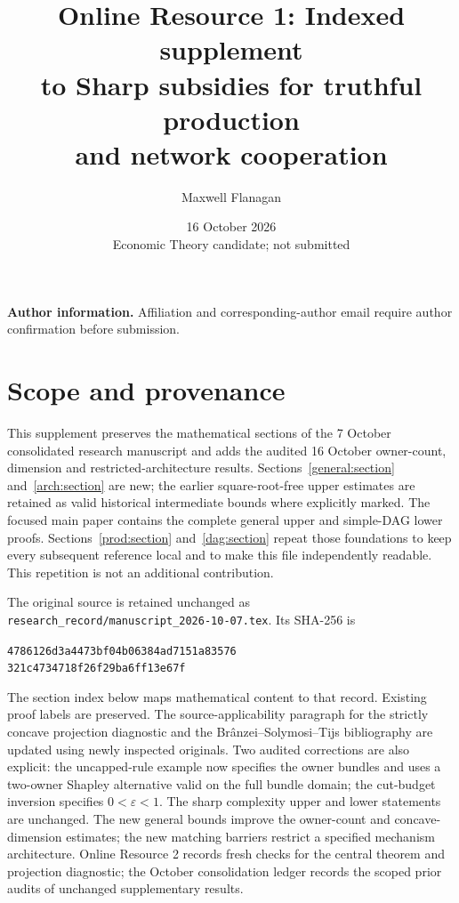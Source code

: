 \documentclass[11pt]{article}
\title{Online Resource 1: Indexed supplement\\to Sharp subsidies for truthful production\\and network cooperation}
\author{Maxwell Flanagan}
\date{16 October 2026\\[2pt]\small Economic Theory candidate; not submitted}
\theoremstyle{definition}\newtheorem{definition}[theorem]{Definition}
\theoremstyle{remark}\newtheorem{remark}[theorem]{Remark}
\begin{document}
\maketitle
\noindent\textbf{Author information.} Affiliation and corresponding-author email
require author confirmation before submission.

\section*{Scope and provenance}
This supplement preserves the mathematical sections of the 7 October
consolidated research manuscript and adds the audited 16 October owner-count,
dimension and restricted-architecture results. Sections~\ref{general:section}
and~\ref{arch:section} are new; the earlier square-root-free upper estimates
are retained as valid historical intermediate bounds where explicitly marked. The focused main paper contains the complete
general upper and simple-DAG lower proofs. Sections~\ref{prod:section}
and~\ref{dag:section} repeat those foundations to keep every subsequent
reference local and to make this file independently readable. This repetition
is not an additional contribution.

The original source is retained unchanged as
\texttt{research\_record/manuscript\_2026-10-07.tex}. Its SHA-256 is
\begin{center}\small\texttt{4786126d3a4473bf04b06384ad7151a83576}\\
\texttt{321c4734718f26f29ba6ff13e67f}\end{center}
The section index below maps mathematical content to that record. Existing
proof labels are preserved. The source-applicability paragraph for the strictly
concave projection diagnostic and the Br\^anzei--Solymosi--Tijs bibliography
are updated using newly inspected originals. Two audited corrections are
also explicit: the uncapped-rule example now specifies the owner bundles
and uses a two-owner Shapley alternative valid on the full bundle domain;
the cut-budget inversion specifies $0<\varepsilon<1$. The sharp complexity upper and lower statements are unchanged. The new
general bounds improve the owner-count and concave-dimension estimates;
the new matching barriers restrict a specified mechanism architecture. Online Resource 2 records fresh checks for the
central theorem and projection diagnostic; the October consolidation ledger
records the scoped prior audits of unchanged supplementary results.
\end{document}

